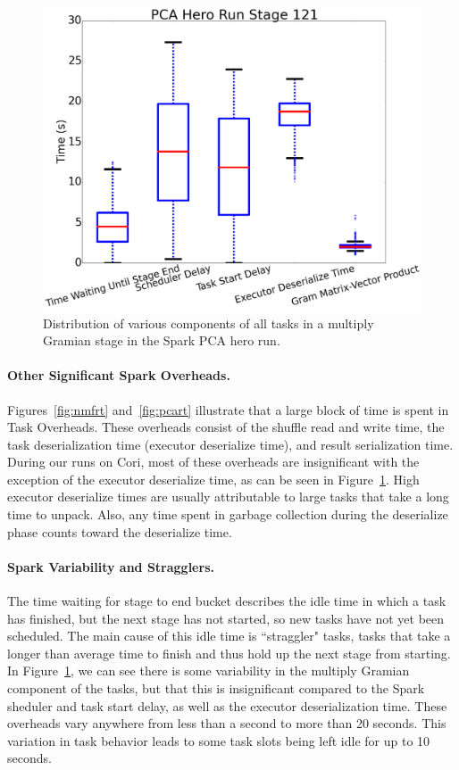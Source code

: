 \begin{figure}[tbhp]
\centering
\includegraphics[width=.6\textwidth]{fig/pca_box_and_whiskers.png}
\caption{Distribution of various components of all tasks in a multiply Gramian stage in the Spark PCA hero run. }
\label{fig:whisker}
\end{figure}

\paragraph{Other Significant Spark Overheads.}
Figures~\ref{fig:nmfrt} and~\ref{fig:pcart} illustrate that a large block of time is spent in Task Overheads. These overheads consist of the shuffle read and write time, the task deserialization time (executor deserialize time), and result serialization time.  During our runs on Cori, most of these overheads are insignificant with the exception of the executor deserialize time, as can be seen in Figure~\ref{fig:whisker}. High executor deserialize times are usually attributable to large tasks that take a long time to unpack. Also, any time spent in garbage collection during the deserialize phase counts toward the deserialize time.

\paragraph{Spark Variability and Stragglers.}
The time waiting for stage to end bucket describes the idle time in which a task has finished, but the next stage has not started, so new tasks have not yet been scheduled. The main cause of this idle time is ``straggler" tasks, tasks that take a longer than average time to finish and thus hold up the next stage from starting. In Figure~\ref{fig:whisker}, we can see there is some variability in the multiply Gramian component of the tasks, but that this is insignificant compared to the Spark sheduler and task start delay, as well as the executor deserialization time. These overheads vary anywhere from less than a second to more than 20 seconds. This variation in task behavior leads to some task slots being left idle for up to 10 seconds.

